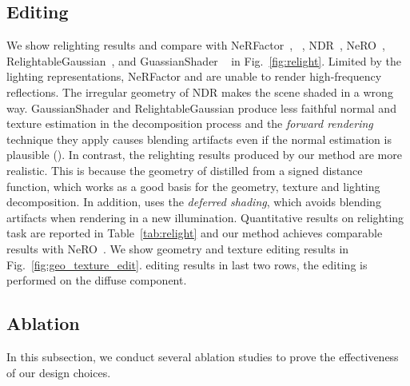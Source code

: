 \subsection{Editing}
We show relighting results and compare with NeRFactor~\cite{NeRFactor}, ~\cite{TensoIR}, NDR~\cite{NvDiffRec}, NeRO~\cite{NeRO}, RelightableGaussian~\cite{RelightableGaussian}, and GuassianShader ~\cite{GaussianShader} in Fig.~\ref{fig:relight}. 
Limited by the lighting representations, NeRFactor and  are unable to render high-frequency reflections. 
The irregular geometry of NDR makes the scene shaded in a wrong way. 
GaussianShader and RelightableGaussian produce less faithful normal and texture estimation in the decomposition process and the \textit{forward rendering} technique they apply causes blending artifacts even if the normal estimation is plausible (). 
In contrast, the relighting results produced by our method are more realistic. 
This is because the geometry of \name distilled from a signed distance function, which works as a good basis for the geometry, texture and lighting decomposition. 
In addition, \name uses the \textit{deferred shading}, which avoids blending artifacts when rendering  in a new illumination. 
Quantitative results on  relighting task are reported in Table~\ref{tab:relight} and our method achieves comparable results with NeRO~\cite{NeRO}. 
We show geometry and texture editing results in Fig.~\ref{fig:geo_texture_edit}. 
 editing results in  last two rows, the editing is performed on the diffuse component. 



\subsection{Ablation}
In this subsection, we conduct several ablation studies to prove the effectiveness of our design choices. 

